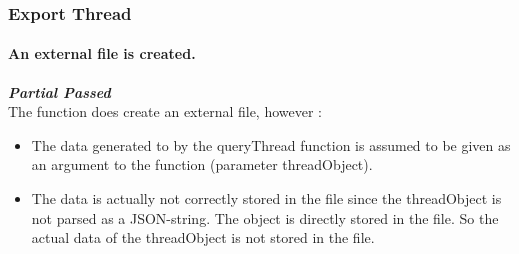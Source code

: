 \subsubsection{Export Thread}
\paragraph{An external file is created.\\}
\textbf{\emph{Partial Passed}} \\
The function does create an external file, however :
	\begin{itemize}
	\item{The data generated to by the queryThread function is assumed to be given as an argument to the function  (parameter threadObject).}
	\item{The data is actually not correctly stored in the file since the threadObject is not parsed as a JSON-string. The object is directly stored in the file. So the actual data of the threadObject is not stored in the file.}
	\end{itemize}
\par


\subsubsection{}


